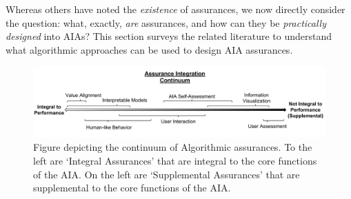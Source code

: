     Whereas others have noted the \textit{existence} of assurances, we now directly consider the question: what, exactly, \textit{are} assurances, and how can they be \textit{practically designed} into AIAs? 
    This section surveys the related literature to understand what algorithmic approaches can be used to design AIA assurances. 
    

    \begin{figure}[b]%
        \centering
        \includegraphics[width=1.0\textwidth]{Figures/Assurance_Integration.pdf}
        \caption{Figure depicting the continuum of Algorithmic assurances. To the left are `Integral Assurances' that are integral to the core functions of the AIA. On the left are `Supplemental Assurances' that are supplemental to the core functions of the AIA. }
        \label{fig:assurance_continuum}
    \end{figure}









